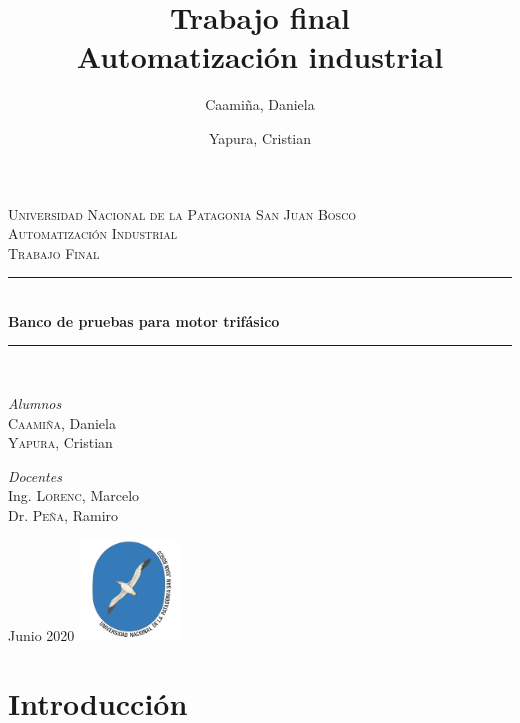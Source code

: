 \documentclass[12pt,a4paper]{article}
\date{}
\author{Caamiña, Daniela \and Yapura, Cristian}
\title{Trabajo final \\Automatización industrial}
\begin{document}
	\begin{titlepage} %
		\newcommand{\HRule}{\rule{\linewidth}{0.5mm}} 
		\center %
		\textsc{\LARGE Universidad Nacional de la Patagonia San Juan Bosco}\\[1.5cm]
		\textsc{\Large Automatización Industrial}\\[0.5cm]
		\textsc{\large Trabajo Final}\\[0.5cm] 
		\HRule\\[0.4cm]
		\huge\bfseries{Banco de pruebas para motor trifásico}\\[0.2cm] 
		\HRule\\[1.5cm]
			\begin{minipage}{0.4\textwidth}
				\begin{flushleft}
					\large
					\textit{Alumnos}\\
					\textsc{Caamiña,} Daniela \\
					\textsc{Yapura,} Cristian  
				\end{flushleft}
			\end{minipage}
			\begin{minipage}{0.4\textwidth}
				\begin{flushright}
					\large
					\textit{Docentes}\\
					Ing. \textsc{Lorenc,} Marcelo \\
					Dr. \textsc{Peña,} Ramiro  
				\end{flushright}
			\end{minipage}
		\vfill\vfill\vfill 
		\large{Junio 2020} 
		\vfill\vfill
		\includegraphics[width=0.2\textwidth]{unpsjb.png}\\[1cm] 
		\vfill 
	\end{titlepage}
	
\tableofcontents
\newpage

\listoffigures
\newpage	
	
	\part{Introducción}
	\newpage

	
\end{document}
